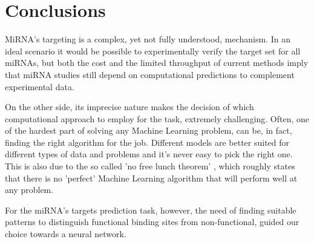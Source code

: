 
\chapter{Conclusions} %

\label{Chapter6} %


MiRNA's targeting is a complex, yet not fully understood, mechanism. In an ideal scenario it would be possible to experimentally verify the target set for all miRNAs, but both the cost and the limited throughput of current methods imply that miRNA studies still depend on computational predictions to complement experimental data.

On the other side, its imprecise nature makes the decision of which computational approach to employ for the task, extremely challenging. Often, one of the hardest part of solving any Machine Learning problem, can be, in fact, finding the right algorithm for the job. Different models are better suited for different types of data and problems and it's never easy to pick the right one. This is also due to the so called 'no free lunch theorem' \cite{nfl}, which roughly states that there is no 'perfect' Machine Learning algorithm that will perform well at any problem.

For the miRNA's targets prediction task, however, the need of finding suitable patterns to distinguish functional binding sites from non-functional, guided our choice towards a  neural network. 


  